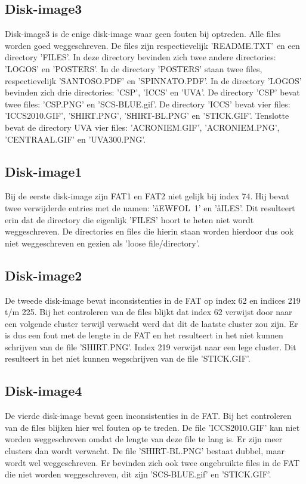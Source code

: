\documentclass[11pt]{article}
\begin{document}
	\subsection{Disk-image3}\label{sec:disk3}
	Disk-image3 is de enige disk-image waar geen fouten bij optreden. Alle files worden goed weggeschreven. De files zijn respectievelijk 'README.TXT' en een directory 'FILES'. In deze directory bevinden zich twee andere directories: 'LOGOS' en 'POSTERS'. In de directory 'POSTERS' staan twee files, respectievelijk 'SANTOSO.PDF' en 'SPINNATO.PDF'. In de directory 'LOGOS' bevinden zich drie directories: 'CSP', 'ICCS' en 'UVA'. De directory 'CSP' bevat twee files: 'CSP.PNG' en 'SCS-BLUE.gif'. De directory 'ICCS' bevat vier files: 'ICCS2010.GIF', 'SHIRT.PNG', 'SHIRT-BL.PNG' en 'STICK.GIF'. Tenslotte bevat de directory UVA vier files: 'ACRONIEM.GIF', 'ACRONIEM.PNG', 'CENTRAAL.GIF' en 'UVA300.PNG'.

	\subsection{Disk-image1}\label{sec:disk1}
	Bij de eerste disk-image zijn FAT1 en FAT2 niet gelijk bij index 74. Hij bevat twee verwijderde entries met de namen: 'åEWFOL~1' en 'åILES'. Dit resulteert erin dat de directory die eigenlijk 'FILES' hoort te heten niet wordt weggeschreven. De directories en files die hierin staan worden hierdoor dus ook niet weggeschreven en gezien als 'loose file/directory'.

	\subsection{Disk-image2}\label{sec:disk2}
	De tweede disk-image bevat inconsistenties in de FAT op index 62 en indices 219 t/m 225. Bij het controleren van de files blijkt dat index 62 verwijst door naar een volgende cluster terwijl verwacht werd dat dit de laatste cluster zou zijn. Er is dus een fout met de lengte in de FAT en het resulteert in het niet kunnen schrijven van de file 'SHIRT.PNG'. Index 219 verwijst naar een lege cluster. Dit resulteert in het niet kunnen wegschrijven van de file 'STICK.GIF'.

	\subsection{Disk-image4}\label{sec:disk4}
	De vierde disk-image bevat geen inconsistenties in de FAT. Bij het controleren van de files blijken hier wel fouten op te treden. De file 'ICCS2010.GIF' kan niet worden weggeschreven omdat de lengte van deze file te lang is. Er zijn meer clusters dan wordt verwacht. De file 'SHIRT-BL.PNG' bestaat dubbel, maar wordt wel weggeschreven. Er bevinden zich ook twee ongebruikte files in de FAT die niet worden weggeschreven, dit zijn 'SCS-BLUE.gif' en 'STICK.GIF'. 
\end{document}
